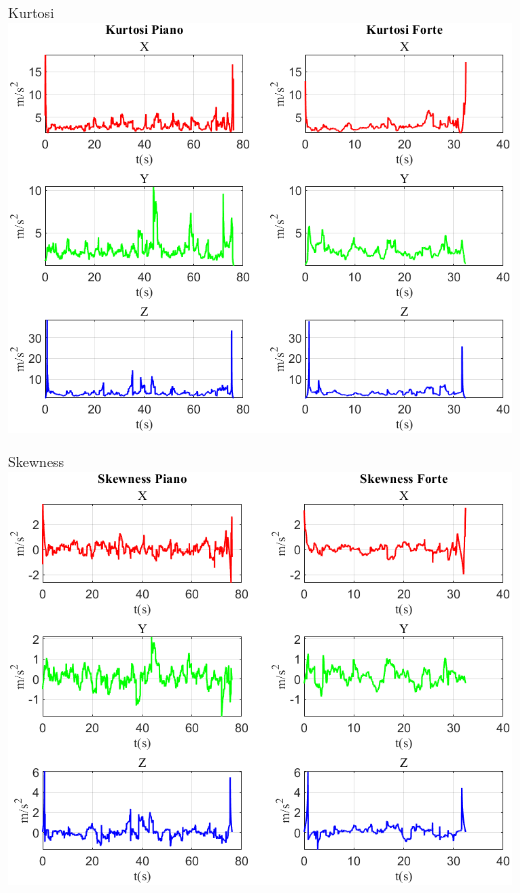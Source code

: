 	\begin{frame}{{Kurtosi}}
		\centering\includegraphics[height=.8\textheight]{figure/Acc/Kurtosi}
	\end{frame}
	
	\begin{frame}{{Skewness}}
		\centering\includegraphics[height=.8\textheight]{figure/Acc/Skewness}
	\end{frame}
	
